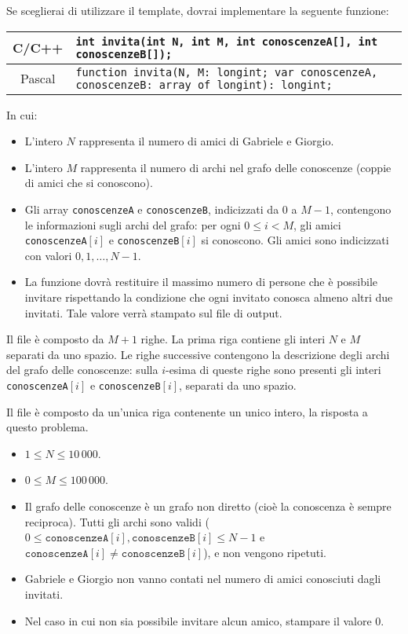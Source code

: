 Se sceglierai di utilizzare il template, dovrai implementare la seguente funzione:
\begin{center}\begin{tabularx}{\textwidth}{|c|X|}
\hline
C/C++  & \verb|int invita(int N, int M, int conoscenzeA[], int conoscenzeB[]);|\\
\hline
Pascal & \footnotesize\verb|function invita(N, M: longint; var conoscenzeA, conoscenzeB: array of longint): longint;|\\
\hline
\end{tabularx}\end{center}
In cui:
\begin{itemize}[nolistsep]
  \item L'intero $N$ rappresenta il numero di amici di Gabriele e Giorgio.
  \item L'intero $M$ rappresenta il numero di archi nel grafo delle conoscenze (coppie di amici che si conoscono).
  \item Gli array \texttt{conoscenzeA} e \texttt{conoscenzeB}, indicizzati da $0$ a $M-1$, contengono le informazioni sugli archi del grafo: per ogni $0\le i < M$, gli amici \texttt{conoscenzeA}$[i]$ e \texttt{conoscenzeB}$[i]$ si conoscono. Gli amici sono indicizzati con valori $0, 1, \ldots, N-1$.
  \item La funzione dovrà restituire il massimo numero di persone che è possibile invitare rispettando la condizione che ogni invitato conosca almeno altri due invitati. Tale valore verrà stampato sul file di output.
\end{itemize}

\InputFile
Il file  è composto da $M + 1$ righe. La prima riga contiene gli interi $N$ e $M$ separati da uno spazio. Le righe successive contengono la descrizione degli archi del grafo delle conoscenze: sulla $i$-esima di queste righe sono presenti gli interi \texttt{conoscenzeA}$[i]$ e \texttt{conoscenzeB}$[i]$, separati da uno spazio.

\OutputFile
Il file \outputfile{} è composto da un'unica riga contenente un unico intero, la risposta a questo problema.

\pagebreak
\Constraints
\begin{itemize}[nolistsep, itemsep=2mm]
	\item $1 \le N \le 10\,000$.
	\item $0 \le M \le 100\,000$.	
	\item Il grafo delle conoscenze è un grafo non diretto (cioè la conoscenza è sempre reciproca). Tutti gli archi sono validi ($0 \le \texttt{conoscenzeA}[i], \texttt{conoscenzeB}[i] \le N-1$ e $\texttt{conoscenzeA}[i] \neq \texttt{conoscenzeB}[i]$), e non vengono ripetuti.
	\item Gabriele e Giorgio non vanno contati nel numero di amici conosciuti dagli invitati.
	\item Nel caso in cui non sia possibile invitare alcun amico, stampare il valore 0.
\end{itemize}

